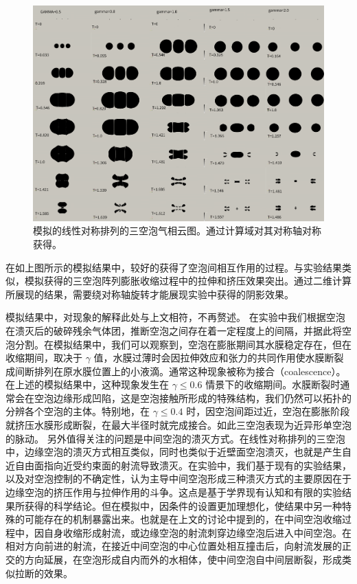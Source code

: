 \begin{figure}[H]
    \centering
    \includegraphics[width=0.8\linewidth]{img/fig4.17.png}
    \caption[模拟的线性对称排列的三空泡气相云图]{模拟的线性对称排列的三空泡气相云图。通过计算域对其对称轴对称获得。}
    \label{fig:4.17}
\end{figure}


在如上图所示的模拟结果中，较好的获得了空泡间相互作用的过程。与实验结果类似，模拟获得的三空泡阵列膨胀收缩过程中的拉伸和挤压效果突出。通过二维计算所展现的结果，需要绕对称轴旋转才能展现实验中获得的阴影效果。

模拟结果中，对现象的解释此处与上文相符，不再赘述。
在实验中我们根据空泡在溃灭后的破碎残余气体团，推断空泡之间存在着一定程度上的间隔，并据此将空泡分割。在模拟结果中，我们可以观察到，空泡在膨胀期间其水膜稳定存在，但在收缩期间，取决于
$\gamma$
值，水膜过薄时会因拉伸效应和张力的共同作用使水膜断裂成间断排列在原水膜位置上的小液滴。通常这种现象被称为接合（coalescence）。在上述的模拟结果中，这种现象发生在
$\gamma\leq 0.6$
情景下的收缩期间。水膜断裂时通常会在空泡边缘形成凹陷，这是空泡接触所形成的特殊结构，我们仍然可以拓扑的分辨各个空泡的主体。特别地，在
$\gamma\leq 0.4$
时，因空泡间距过近，空泡在膨胀阶段就挤压水膜形成断裂，在最大半径时就完成接合。如此三空泡表现为近异形单空泡的脉动。
另外值得关注的问题是中间空泡的溃灭方式。在线性对称排列的三空泡中，边缘空泡的溃灭方式相互类似，同时也类似于近壁面空泡溃灭，也就是产生自近自由面指向近受约束面的射流导致溃灭。在实验中，我们基于现有的实验结果，以及对空泡控制的不确定性，认为主导中间空泡形成三种溃灭方式的主要原因在于边缘空泡的挤压作用与拉伸作用的斗争。这点是基于学界现有认知和有限的实验结果所获得的科学结论。但在模拟中，因条件的设置更加理想化，使结果中另一种特殊的可能存在的机制暴露出来。也就是在上文的讨论中提到的，在中间空泡收缩过程中，因自身收缩形成射流，或边缘空泡的射流刺穿边缘空泡后进入中间空泡。在相对方向前进的射流，在接近中间空泡的中心位置处相互撞击后，向射流发展的正交的方向延展，在空泡形成自内而外的水相体，使中间空泡自中间层断裂，形成类似拉断的效果。

